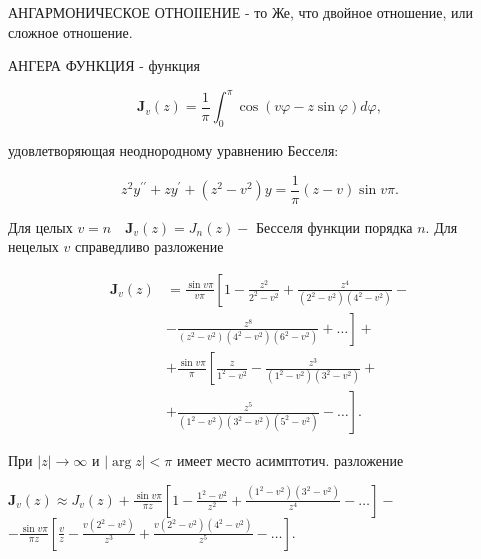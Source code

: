 \documentclass[10pt]{article}
\begin{document}
АНГАРМОНИЧЕСКОЕ ОТНОІІЕНИЕ - то Же, что двойное отношение, или сложное отношение.



АНГЕРА ФУНКЦИЯ - функция



\[

\mathbf{J}_{v}(z)=\frac{1}{\pi} \int_{0}^{\pi} \cos (v \varphi-z \sin \varphi) d \varphi,

\]



удовлетворяющая неоднородному уравнению Бесселя:



\[

z^{2} y^{\prime \prime}+z y^{\prime}+\left(z^{2}-v^{2}\right) y=\frac{1}{\pi}(z-v) \sin v \pi .

\]



Для целых $v=n \quad \mathbf{J}_{v}(z)=J_{n}(z)-$ Бесселя функции порядка $n$. Для нецелых $v$ справедливо разложение



\[

\begin{aligned}

\mathbf{J}_{v}(z) & =\frac{\sin v \pi}{v \pi}\left[1-\frac{z^{2}}{2^{2}-v^{2}}+\frac{z^{4}}{\left(2^{2}-v^{2}\right)\left(4^{2}-v^{2}\right)}-\right. \\

& \left.-\frac{z^{8}}{\left(z^{2}-v^{2}\right)\left(4^{2}-v^{2}\right)\left(6^{2}-v^{2}\right)}+\ldots\right]+ \\

& +\frac{\sin v \pi}{\pi}\left[\frac{z}{1^{2}-v^{2}}-\frac{z^{3}}{\left(1^{2}-v^{2}\right)\left(3^{2}-v^{2}\right)}+\right. \\

& \left.+\frac{z^{5}}{\left(1^{2}-v^{2}\right)\left(3^{2}-v^{2}\right)\left(5^{2}-v^{2}\right)}-\ldots\right] .

\end{aligned}

\]



При $|z| \rightarrow \infty$ и $|\arg z|<\pi$ имеет место асимптотич. разложение



$\mathbf{J}_{v}(z) \approx J_{v}(z)+\frac{\sin v \pi}{\pi z}\left[1-\frac{1^{2}-v^{2}}{z^{2}}+\frac{\left(1^{2}-v^{2}\right)\left(3^{2}-v^{2}\right)}{z^{4}}-\ldots\right]-$ $-\frac{\sin v \pi}{\pi z}\left[\frac{v}{z}-\frac{v\left(2^{2}-v^{2}\right)}{z^{3}}+\frac{v\left(2^{2}-v^{2}\right)\left(4^{2}-v^{2}\right)}{z^{5}}-\ldots\right]$.
\end{document}
